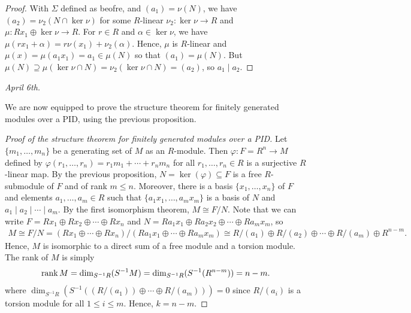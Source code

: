 \begin{proof}
    With $\Sigma$ defined as beofre, and $(a_{1}) = \nu(N)$, we have $(a_{2}) = \nu_{2}(N \cap \ker \nu)$ for some $R$-linear $\nu_{2} : \ker \nu \to R$ and $\mu : Rx_{1} \oplus \ker \nu \to R$. For $r \in R$ and $\alpha \in \ker \nu$, we have $\mu(rx_{1}+\alpha) = r\nu(x_{1}) + \nu_{2}(\alpha)$. Hence, $\mu$ is $R$-linear and $\mu(x) = \mu(a_{1}x_{1}) = a_{1} \in \mu(N)$ so that $(a_{1}) = \mu(N)$. But $\mu(N) \supseteq \mu(\ker \nu \cap N) = \nu_{2}(\ker \nu \cap N) = (a_{2})$, so $a_{1} \mid a_{2}$.
\end{proof}

\noindent \textit{April 6th.}

We are now equipped to prove the structure theorem for finitely generated modules over a PID, using the previous proposition.

\begin{proof}[Proof of the structure theorem for finitely generated modules over a PID]
    Let $\{m_{1},\ldots,m_{n}\}$ be a generating set of $M$ as an $R$-module. Then $\varphi:F=R^{n} \to M$ defined by $\varphi(r_{1},\ldots,r_{n}) = r_{1}m_{1} + \cdots + r_{n}m_{n}$ for all $r_{1},\ldots,r_{n} \in R$ is a surjective $R$-linear map. By the previous proposition, $N = \ker(\varphi) \subseteq F$ is a free $R$-submodule of $F$ and of rank $m \leq n$. Moreover, there is a basis $\{x_{1},\ldots,x_{n}\}$ of $F$ and elements $a_{1},\ldots,a_{m} \in R$ such that $\{a_{1}x_{1},\ldots,a_{m}x_{m}\}$ is a basis of $N$ and $a_{1} \mid a_{2} \mid \cdots \mid a_{m}$. By the first isomorphism theorem, $M \cong F/N$. Note that we can write $F = Rx_{1} \oplus Rx_{2} \oplus \cdots \oplus Rx_{n}$ and $N = Ra_{1}x_{1} \oplus Ra_{2}x_{2} \oplus \cdots \oplus Ra_{m}x_{m}$, so
    \begin{align}
        M \cong F/N = (Rx_{1} \oplus \cdots \oplus Rx_{n})/(Ra_{1}x_{1} \oplus \cdots \oplus Ra_{m}x_{m}) \cong R/(a_{1}) \oplus R/(a_{2}) \oplus \cdots \oplus R/(a_{m}) \oplus R^{n-m}.
    \end{align}
    Hence, $M$ is isomorphic to a direct sum of a free module and a torsion module. The rank of $M$ is simply
    \begin{align}
        \operatorname{rank} M = \dim_{S^{-1}R}(S^{-1}M) = \dim_{S^{-1}R}(S^{-1}(R^{n-m})) = n-m.
    \end{align}
    where $\dim_{S^{-1}R}(S^{-1}((R/(a_{1})) \oplus \cdots \oplus R/(a_{m}))) = 0$ since $R/(a_{i})$ is a torsion module for all $1 \leq i \leq m$. Hence, $k = n - m$.
\end{proof}

